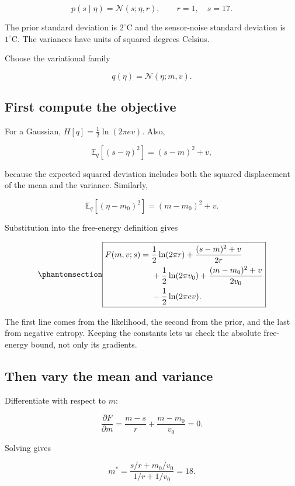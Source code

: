 \documentclass[
  letterpaper,
  DIV=11,
  numbers=noendperiod]{scrreprt}
\begin{document}
\[
p(s\mid\eta)=\mathcal N(s;\eta,r),
\qquad r=1,\quad s=17.
\]

The prior standard deviation is \(2^\circ\mathrm C\) and the
sensor-noise standard deviation is \(1^\circ\mathrm C\). The variances
have units of squared degrees Celsius.

Choose the variational family

\[
q(\eta)=\mathcal N(\eta;m,v).
\]

\subsection{First compute the
objective}\label{first-compute-the-objective}

For a Gaussian, \(H[q]=\tfrac12\ln(2\pi e v)\). Also,

\[
\mathbb E_q[(s-\eta)^2]=(s-m)^2+v,
\]

because the expected squared deviation includes both the squared
displacement of the mean and the variance. Similarly,

\[
\mathbb E_q[(\eta-m_0)^2]=(m-m_0)^2+v.
\]

Substitution into the free-energy definition gives

\begin{equation}\protect\phantomsection\label{eq-vfe-gaussian}{
\boxed{
\begin{aligned}
F(m,v;s)={}&\frac12\ln(2\pi r)
+\frac{(s-m)^2+v}{2r}\\
&+\frac12\ln(2\pi v_0)
+\frac{(m-m_0)^2+v}{2v_0}\\
&-\frac12\ln(2\pi e v).
\end{aligned}
}
}\end{equation}

The first line comes from the likelihood, the second from the prior, and
the last from negative entropy. Keeping the constants lets us check the
absolute free-energy bound, not only its gradients.

\subsection{Then vary the mean and
variance}\label{then-vary-the-mean-and-variance}

Differentiate with respect to \(m\):

\[
\frac{\partial F}{\partial m}
=\frac{m-s}{r}+\frac{m-m_0}{v_0}=0.
\]

Solving gives

\[
m^*=\frac{s/r+m_0/v_0}{1/r+1/v_0}=18.
\]
\end{document}
